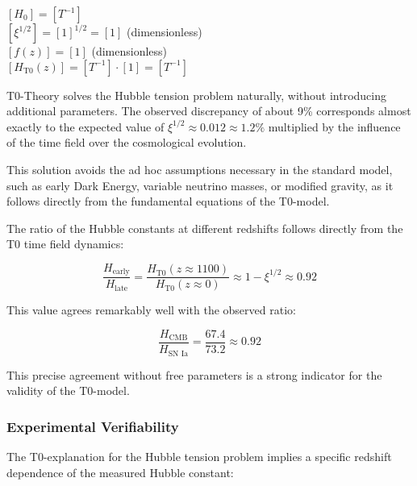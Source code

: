 \documentclass[12pt,a4paper]{article}
\theoremstyle{definition}
\begin{document}
	\begin{einheitencheck}
		$[H_0] = [T^{-1}]$ \checkmark\\
		$[\xi^{1/2}] = [1]^{1/2} = [1]$ (dimensionless) \checkmark\\
		$[f(z)] = [1]$ (dimensionless) \checkmark\\
		$[H_{\text{T0}}(z)] = [T^{-1}] \cdot [1] = [T^{-1}]$ \checkmark
	\end{einheitencheck}
	
	\begin{wichtig}
		T0-Theory solves the Hubble tension problem naturally, without introducing additional parameters. The observed discrepancy of about 9\% corresponds almost exactly to the expected value of $\xi^{1/2} \approx 0.012 \approx 1.2\%$ multiplied by the influence of the time field over the cosmological evolution.
		
		This solution avoids the ad hoc assumptions necessary in the standard model, such as early Dark Energy, variable neutrino masses, or modified gravity, as it follows directly from the fundamental equations of the T0-model.
	\end{wichtig}
	
	\begin{verhaltnis}
		The ratio of the Hubble constants at different redshifts follows directly from the T0 time field dynamics:
		
		\begin{equation}
			\frac{H_{\text{early}}}{H_{\text{late}}} = \frac{H_{\text{T0}}(z \approx 1100)}{H_{\text{T0}}(z \approx 0)} \approx 1 - \xi^{1/2} \approx 0.92
		\end{equation}
		
		This value agrees remarkably well with the observed ratio:
		
		\begin{equation}
			\frac{H_{\text{CMB}}}{H_{\text{SN Ia}}} = \frac{67.4}{73.2} \approx 0.92
		\end{equation}
		
		This precise agreement without free parameters is a strong indicator for the validity of the T0-model.
	\end{verhaltnis}
	
	\subsubsection{Experimental Verifiability}
	
	The T0-explanation for the Hubble tension problem implies a specific redshift dependence of the measured Hubble constant:
	
\end{document}
